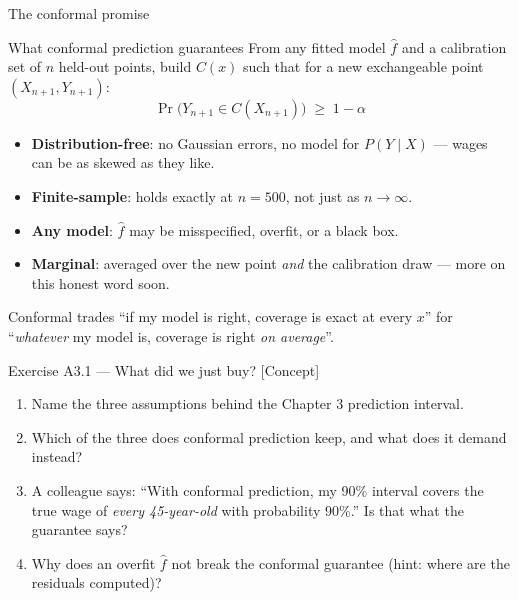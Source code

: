 \documentclass[aspectratio=169,11pt]{beamer}
\begin{document}
\begin{frame}{The conformal promise}
  \begin{block}{What conformal prediction guarantees}
    From any fitted model $\hat f$ and a calibration set of $n$ held-out points, build
    $C(x)$ such that for a new exchangeable point $(X_{n+1}, Y_{n+1})$:
    \[
      \boxed{\;\Pr\big(Y_{n+1} \in C(X_{n+1})\big) \;\ge\; 1 - \alpha\;}
    \]
  \end{block}
  \footnotesize
  \begin{readme}
    \begin{itemize}
      \item \textbf{Distribution-free}: no Gaussian errors, no model for
            $P(Y \mid X)$ --- wages can be as skewed as they like.
      \item \textbf{Finite-sample}: holds exactly at $n = 500$, not just as
            $n \to \infty$.
      \item \textbf{Any model}: $\hat f$ may be misspecified, overfit, or a black box.
      \item \textbf{Marginal}: averaged over the new point \emph{and} the calibration
            draw --- more on this honest word soon.
    \end{itemize}
  \end{readme}
  \begin{takeaway}
    Conformal trades ``if my model is right, coverage is exact at every $x$'' for
    ``\emph{whatever} my model is, coverage is right \emph{on average}''.
  \end{takeaway}
\end{frame}

\begin{frame}{Exercise A3.1 --- What did we just buy? [Concept]}
\begin{exercise}
  \begin{enumerate}
    \item Name the three assumptions behind the Chapter 3 prediction interval.
    \item Which of the three does conformal prediction keep, and what does it demand
          instead?
    \item A colleague says: ``With conformal prediction, my 90\% interval covers the
          true wage of \emph{every 45-year-old} with probability 90\%.'' Is that what
          the guarantee says?
    \item Why does an overfit $\hat f$ not break the conformal guarantee (hint: where
          are the residuals computed)?
  \end{enumerate}
\end{exercise}
\end{frame}
\end{document}
